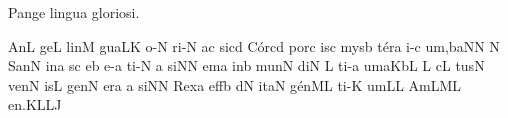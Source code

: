\beginhymn Pange lingua gloriosi.

\Internote
\nosolesmescustos
\initiumgregorianum
%
\sgn {}An\punctum L\egn
\sgn ge{}\punctum L\egn
\spatium
\sgn l{i}n\punctum M\egn
\sgn gua\clivis LK\egn
\spatium
{}o{-}\punctum N\egn
\sgn ri{-}\punctum N\egn
{}\pes ac\egn
\sgn si{}\punctum c\augmentum d\egn
\spatium
\divisiominima
\spatium
\sgn C{\'o}r\pes cd\egn
\sgn por\punctum c\egn
\sgn {}is\punctum c\egn
\spatium
\sgn mys\punctum b\egn
\sgn t{\'e}r\punctum a\egn
\sgn {}i{-}\punctum c\egn
\sgn {}u{m,}\climacus baN\augmentum N\egn
\spatium
\divisiominor
\spatium
\custos N
\lineaproxima
\sgn San\punctum N\egn
{}in\punctum a\egn
\sgn {}{\'\i}s\punctum c\egn
{}e{}\punctum b\egn
\spatium
{}e{-}\punctum a\egn
\sgn ti{-}\punctum N\egn
{}\punctum a\egn
\sgn si{}\punctum N\augmentum N\egn
\spatium
\divisiominima
\spatium
em\punctum a\egn
\spatium
\sgn {}in\punctum b\egn
\spatium
\sgn m{u}n\punctum N\egn
\sgn di{}\punctum N\egn
\spatium
{}\punctum L\egn
\sgn ti{-}\punctum a\egn
\sgn {}u{m}\clivis aK\augmentumduplex bL\egn
\spatium
\divisiominor
\spatium
\custos L
\lineaproxima
c\punctum L\egn
\sgn tus\punctum N\egn
\spatium
\sgn v{e}n\punctum N\egn
{}is\punctum L\egn
\spatium
\sgn gen\punctum N\egn
\sgn {}er\punctum a\egn
{}\punctum a\egn
\sgn si{}\punctum N\augmentum N\egn
\spatium
\divisiominima
\spatium
\sgn Rex\punctum a\egn
\spatium
\sgn {}e{ff}\punctum b\egn
{}d\punctum N\egn
\sgn {}it\clivis aN\egn
\spatium
\sgn g{\'e}n\clivis ML\egn
\sgn ti{-}\punctum K\egn
\sgn {}u{m}\punctum L\augmentum L\egn
\spatium
\divisiofinalis
\spatium
\spatium
\sgn {}Am\torculus LML\egn
\sgn {}e{n.}\pes KL\augmentumduplex LJ\egn
\spatium
\Finisgregoriana

\bigskip

\beginlyrics

